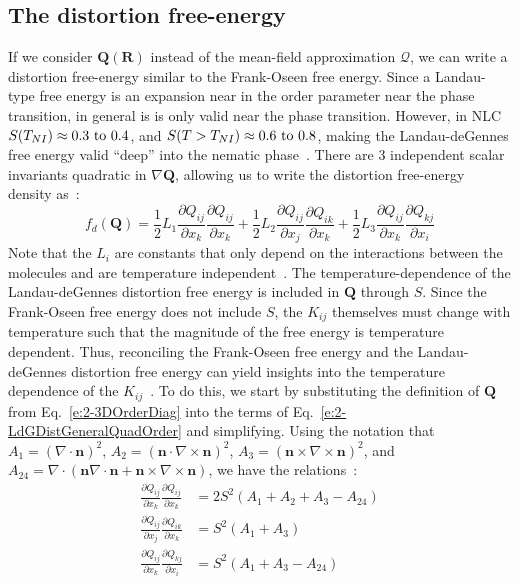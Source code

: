 \subsection{The distortion free-energy}
If we consider $\mathbf{Q}(\mathbf{R})$ instead of the mean-field approximation $\bm{\mathcal{Q}}$, we can write a distortion free-energy similar to the Frank-Oseen free energy.
Since a Landau-type free energy is an expansion near in the order parameter near the phase transition, in general is is only valid near the phase transition.
However, in NLC $S(T_{NI}) \approx 0.3 \textup{ to } 0.4$, and $S(T > T_{NI}) \approx 0.6 \textup{ to } 0.8$, making the Landau-deGennes free energy valid ``deep'' into the nematic phase~\cite{RN198}.
There are 3 independent scalar invariants quadratic in $\nabla\mathbf{Q}$, allowing us to write the distortion free-energy density as~\cite{RN189,RN198}:
\begin{equation}
  f_d(\mathbf{Q}) = \frac{1}{2} L_1 \frac{\partial Q_{ij}}{\partial x_k} \frac{\partial Q_{ij}}{\partial x_k}
    + \frac{1}{2} L_2 \frac{\partial Q_{ij}}{\partial x_j} \frac{\partial Q_{ik}}{\partial x_k}
    + \frac{1}{2} L_3 \frac{\partial Q_{ij}}{\partial x_k} \frac{\partial Q_{kj}}{\partial x_i}\label{e:2-LdGDistGeneralQuadOrder}
\end{equation}
Note that the $L_i$ are constants that only depend on the interactions between the molecules and are temperature independent~\cite{RN198}.
The temperature-dependence of the Landau-deGennes distortion free energy is included in $\mathbf{Q}$ through $S$.
Since the Frank-Oseen free energy does not include $S$, the $K_{ij}$ themselves must change with temperature such that the magnitude  of the free energy is temperature dependent.
Thus, reconciling the Frank-Oseen free energy and the Landau-deGennes distortion free energy can yield insights into the temperature dependence of the $K_{ij}$~\cite{RN189,RN198}.
To do this, we start by substituting the definition of $\mathbf{Q}$ from Eq.~\ref{e:2-3DOrderDiag} into the terms of Eq.~\ref{e:2-LdGDistGeneralQuadOrder} and simplifying. Using the notation that
    $A_1 = (\nabla \cdot \mathbf{n})^2$,
    $A_2 = (\mathbf{n} \cdot \nabla \times \mathbf{n})^2$,
    $A_3 = (\mathbf{n} \times \nabla \times \mathbf{n})^2$, and
    $A_{24} = \nabla \cdot (\mathbf{n} \nabla \cdot \mathbf{n} + \mathbf{n} \times \nabla \times \mathbf{n})$, we have the relations~\cite{RN189,RN198}:
\label{e:2-LdGRelationsQuadOrder}
\begin{align}
  \frac{\partial Q_{ij}}{\partial x_k} \frac{\partial Q_{ij}}{\partial x_k} & =
    2 S^2(A_1 + A_2 + A_3 -A_{24})\tag{\theequation a} \\
  \frac{\partial Q_{ij}}{\partial x_j} \frac{\partial Q_{ik}}{\partial x_k} &=
    S^2 (A_1 + A_3)\tag{\theequation b}\\
  \frac{\partial Q_{ij}}{\partial x_k} \frac{\partial Q_{kj}}{\partial x_i} &=
    S^2 (A_1 + A_3 - A_{24})\tag{\theequation b}
\end{align}
